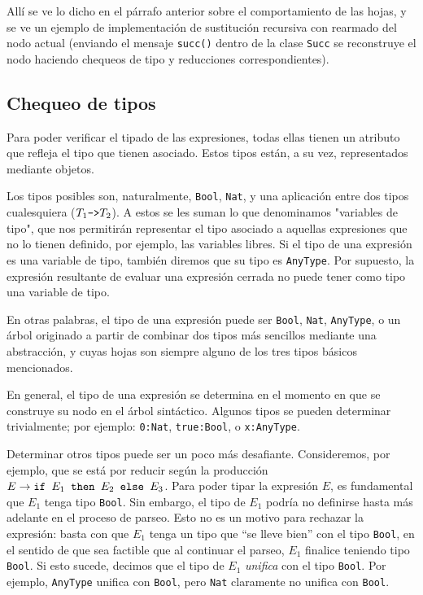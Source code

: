 \documentclass[11pt]{article}
\begin{document}
Allí se ve lo dicho en el párrafo anterior sobre el comportamiento de las hojas, y se ve un ejemplo de implementación de sustitución recursiva con rearmado del nodo actual (enviando el mensaje \lstinline|succ()| dentro de la clase \lstinline|Succ| se reconstruye el nodo haciendo chequeos de tipo y reducciones correspondientes).

\subsection{Chequeo de tipos}

Para poder verificar el tipado de las expresiones, todas ellas tienen un
atributo que refleja el tipo que tienen asociado. Estos tipos están, a su
vez, representados mediante objetos.

Los tipos posibles son, naturalmente, \verb|Bool|, \verb|Nat|, y una
aplicación entre dos tipos cualesquiera ($T_1\verb|->|T_2$). A estos se les
suman lo que denominamos "variables de tipo", que nos permitirán representar
el tipo asociado a aquellas expresiones que no lo tienen definido, por
ejemplo, las variables libres. Si el tipo de una expresión es una variable
de tipo, también diremos que su tipo es \verb|AnyType|. Por supuesto, la
expresión resultante de evaluar una expresión cerrada no puede tener como
tipo una variable de tipo.

En otras palabras, el tipo de una expresión puede ser \verb|Bool|,
\verb|Nat|, \verb|AnyType|, o un árbol originado a partir de combinar dos
tipos más sencillos mediante una abstracción, y cuyas hojas son siempre
alguno de los tres tipos básicos mencionados.

En general, el tipo de una expresión se determina en el momento en que se
construye su nodo en el árbol sintáctico. Algunos tipos se pueden determinar
trivialmente; por ejemplo: \verb|0:Nat|, \verb|true:Bool|, o 
\verb|x:AnyType|.

Determinar otros tipos puede ser un poco más desafiante. Consideremos, por
ejemplo, que se está por reducir según la producción
$E \rightarrow \verb|if | E_1 \verb| then | E_2 \verb| else | E_3$. Para
poder tipar la expresión $E$, es fundamental que $E_1$ tenga tipo
\verb|Bool|. Sin embargo, el tipo de $E_1$ podría no definirse hasta más
adelante en el proceso de parseo. Esto no es un motivo para rechazar la
expresión: basta con que $E_1$ tenga un tipo que ``se lleve bien'' con el
tipo \verb|Bool|, en el sentido de que sea factible que al continuar el
parseo, $E_1$ finalice teniendo tipo \verb|Bool|. Si esto sucede,
decimos que el tipo de $E_1$ \emph{unifica} con el tipo \verb|Bool|.
Por ejemplo, \verb|AnyType| unifica con \verb|Bool|, pero \verb|Nat|
claramente no unifica con \verb|Bool|.
\end{document}
